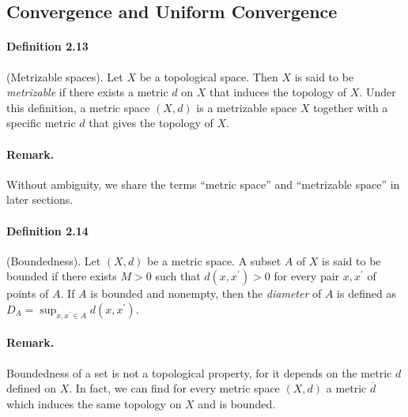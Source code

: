 \documentclass{article}
\numberwithin{equation}{section}
\theoremstyle{plain}
\theoremstyle{definition}
\begin{document}
\subsection{Convergence and Uniform Convergence}
\paragraph{Definition 2.13\label{def:2.13}} (Metrizable spaces). Let $X$ be a topological space. Then $X$ is said to be \textit{metrizable} if there exists a metric $d$ on $X$ that induces the topology of $X$. Under this definition, a metric space $(X,d)$ is a metrizable space $X$ together with a specific metric $d$ that gives the topology of $X$.

\paragraph{Remark.} Without ambiguity, we share the terms ``metric space'' and ``metrizable space'' in later sections.

\paragraph{Definition 2.14\label{def:2.14}} (Boundedness). Let $(X,d)$ be a metric space. A subset $A$ of $X$ is said to be bounded if there exists $M>0$ such that $d(x,x^\prime)>0$ for every pair $x,x^\prime$ of points of $A$. If $A$ is bounded and nonempty, then the \textit{diameter} of $A$ is defined as $D_A=\sup_{x,x^\prime\in A}d(x,x^\prime)$.

\paragraph{Remark.} Boundedness of a set is not a topological property, for it depends on the metric $d$ defined on $X$. In fact, we can find  for every metric space $(X,d)$ a metric $\overline{d}$ which induces the same topology on $X$ and is bounded.
\end{document}

